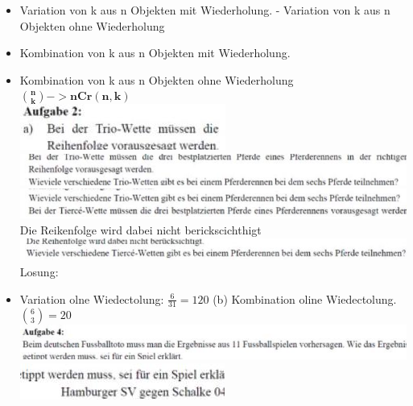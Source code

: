 \documentclass[10pt]{article}
\begin{document}
\begin{itemize}
  \item Variation von k aus n Objekten mit Wiederholung. - Variation von k aus n Objekten ohne Wiederholung
  \item Kombination von k aus n Objekten mit Wiederholung.
  \item Kombination von k aus n Objekten ohne Wiederholung\\
$\binom{\boldsymbol{n}}{\boldsymbol{k}}->\mathbf{n C r}(\mathbf{n}, \mathbf{k})$\\
\includegraphics[width=\linewidth]{images/2024_12_29_0906b02acf849bda8665g-3(21)}\\
\includegraphics[width=\linewidth]{images/2024_12_29_0906b02acf849bda8665g-3(8)}\\
\includegraphics[width=\linewidth]{images/2024_12_29_0906b02acf849bda8665g-3(2)}\\
Die Reikenfolge wird dabei nicht berickscichthigt\\
\includegraphics[width=\linewidth]{images/2024_12_29_0906b02acf849bda8665g-3(11)}\\
Losung:
  \item Variation olne Wiedectolung: $\frac{6}{31}=120$ (b) Kombination oline Wiedectolung. $\binom{6}{3}=20$\\
\includegraphics[width=\linewidth]{images/2024_12_29_0906b02acf849bda8665g-3(17)}\\
\includegraphics[width=\linewidth]{images/2024_12_29_0906b02acf849bda8665g-3(13)}\\

\end{itemize}
\end{document}
